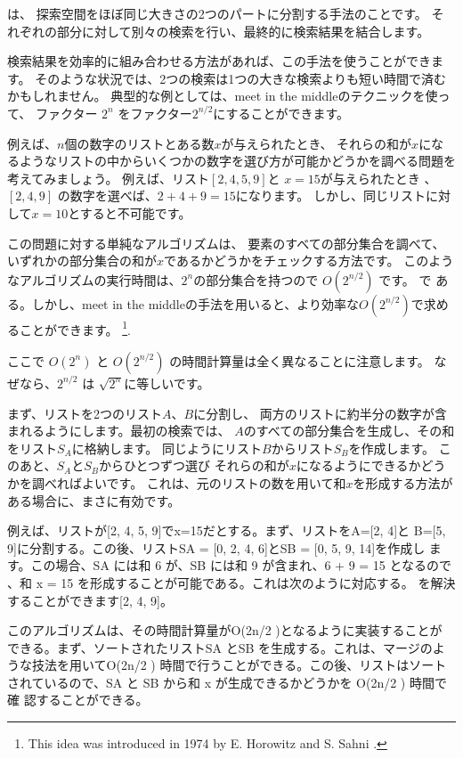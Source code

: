
は、
探索空間をほぼ同じ大きさの2つのパートに分割する手法のことです。
それぞれの部分に対して別々の検索を行い、最終的に検索結果を結合します。

検索結果を効率的に組み合わせる方法があれば、この手法を使うことができます。
そのような状況では、2つの検索は1つの大きな検索よりも短い時間で済むかもしれません。
典型的な例としては、meet in the middleのテクニックを使って、
ファクター $2^n$ をファクター$2^{n/2}$にすることができます。

例えば、$n$個の数字のリストとある数$x$が与えられたとき、
それらの和が$x$になるようなリストの中からいくつかの数字を選び方が可能かどうかを調べる問題を考えてみましょう。
例えば、リスト$[2,4,5,9]$と $x = 15$が与えられたとき 、
$[2,4,9]$ の数字を選べば、$2+4+9=15$になります。
しかし、同じリストに対して$x=10$とすると不可能です。

この問題に対する単純なアルゴリズムは、
要素のすべての部分集合を調べて、
いずれかの部分集合の和が$x$であるかどうかをチェックする方法です。
このようなアルゴリズムの実行時間は、$2^n$の部分集合を持つので
$O(2^{n/2})$ です。
で ある。しかし、meet in the middleの手法を用いると、より効率な$O(2^{n/2})$で求めることができます。
\footnote{This
idea was introduced in 1974 by E. Horowitz and S. Sahni \cite{hor74}.}.

ここで $O(2^n)$ と $O(2^{n/2})$ の時間計算量は全く異なることに注意します。
なぜなら、$2^{n/2}$ は $\sqrt{2^n}$に等しいです。

まず、リストを2つのリスト$A$、$B$に分割し、
両方のリストに約半分の数字が含まれるようにします。最初の検索では、
$A$のすべての部分集合を生成し、その和をリスト$S_A$に格納します。
同じようにリスト$B$からリスト$S_B$を作成します。
このあと、$S_A$と$S_B$からひとつずつ選び
それらの和が$x$になるようにできるかどうかを調べればよいです。
これは、元のリストの数を用いて和$x$を形成する方法がある場合に、まさに有効です。

例えば、リストが[2, 4, 5, 9]でx=15だとする。まず、リストをA=[2, 4]と B=[5, 9]に分割する。この後、リストSA = [0, 2, 4, 6]とSB = [0, 5, 9, 14]を作成し ます。この場合、SA には和 6 が、SB には和 9 が含まれ、6 + 9 = 15 となるので 、和 x = 15 を形成することが可能である。これは次のように対応する。 を解決することができます[2, 4, 9]。

このアルゴリズムは、その時間計算量がO(2n/2 )となるように実装することが できる。まず、ソートされたリストSA とSB を生成する。これは、マージのよ うな技法を用いてO(2n/2 ) 時間で行うことができる。この後、リストはソート されているので、SA と SB から和 x が生成できるかどうかを O(2n/2 ) 時間で確 認することができる。

